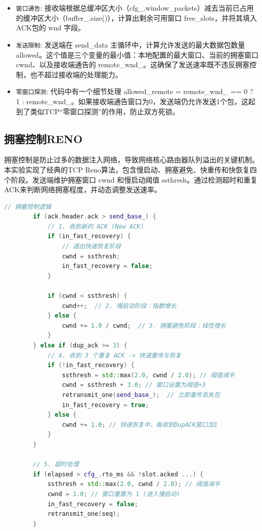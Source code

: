 \documentclass[a4paper]{article}
\begin{document}
	\begin{itemize}
		\item \texttt{窗口通告}: 接收端根据总缓冲区大小（cfg\_.window\_packets）减去当前已占用的缓冲区大小（buffer\_.size()），计算出剩余可用窗口 free\_slots，并将其填入ACK包的 wnd 字段。
		\item \texttt{发送限制}: 发送端在 send\_data 主循环中，计算允许发送的最大数据包数量 allowed。这个值是三个变量的最小值：本地配置的最大窗口、当前的拥塞窗口 cwnd、以及接收端通告的 remote\_wnd\_。这确保了发送速率既不违反拥塞控制，也不超过接收端的处理能力。
		\item \texttt{零窗口探测}: 代码中有一个细节处理 allowed\_remote = remote\_wnd\_ == 0 ? 1 : remote\_wnd\_。如果接收端通告窗口为0，发送端仍允许发送1个包，这起到了类似TCP“零窗口探测”的作用，防止双方死锁。
	\end{itemize}

	\subsection{拥塞控制RENO}
	拥塞控制是防止过多的数据注入网络，导致网络核心路由器队列溢出的关键机制。本实验实现了经典的TCP Reno算法，包含慢启动、拥塞避免、快重传和快恢复四个阶段。发送端维护拥塞窗口 cwnd 和慢启动阈值 ssthresh。通过检测超时和重复ACK来判断网络拥塞程度，并动态调整发送速率。

	\begin{lstlisting}[language=C++]
		// 拥塞控制逻辑
		if (ack.header.ack > send_base_) {
			// 1. 收到新的 ACK (New ACK)
			if (in_fast_recovery) {
				// 退出快速恢复阶段
				cwnd = ssthresh; 
				in_fast_recovery = false;
			}
			
			if (cwnd < ssthresh) {
				cwnd++;  // 2. 慢启动阶段：指数增长
			} else {
				cwnd += 1.0 / cwnd;  // 3. 拥塞避免阶段：线性增长
			}
		} else if (dup_ack >= 3) {
			// 4. 收到 3 个重复 ACK -> 快速重传与恢复
			if (!in_fast_recovery) {
				ssthresh = std::max(2.0, cwnd / 2.0); // 阈值减半
				cwnd = ssthresh + 3.0; // 窗口设置为阈值+3
				retransmit_one(send_base_);  // 立即重传丢失包
				in_fast_recovery = true;
			} else {
				cwnd += 1.0; // 快速恢复中，每收到DupACK窗口加1
			}
		}
		
		// 5. 超时处理
		if (elapsed > cfg_.rto_ms && !slot.acked ...) {
			ssthresh = std::max(2.0, cwnd / 2.0); // 阈值减半
			cwnd = 1.0; // 窗口重置为 1 (进入慢启动)
			in_fast_recovery = false;
			retransmit_one(seq);
		}
	\end{lstlisting}
\end{document}
